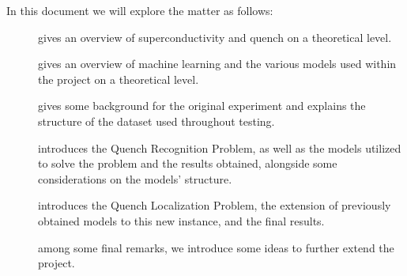 In this document we will explore the matter as follows:
\begin{description}
	\item[] gives an overview of superconductivity and quench on a
		theoretical level.
	\item[] gives an overview of machine learning and the various models used
		within the project on a theoretical level.
	\item[] gives some background for the original experiment and explains the
		structure of the dataset used throughout testing.
	\item[] introduces the Quench Recognition Problem, as well as the models
		utilized to solve the problem and the results obtained, alongside some
		considerations on the models' structure.
	\item[] introduces the Quench Localization Problem, the extension of previously
		obtained models to this new instance, and the final results.
	\item[] among some final remarks, we introduce some ideas to further extend
		the project.
\end{description}
